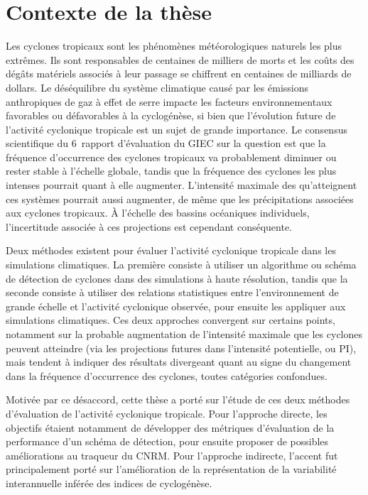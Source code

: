\documentclass[../main.tex]{subfiles}
\begin{document}
\section*{Contexte de la thèse}

Les cyclones tropicaux sont les phénomènes météorologiques naturels les plus extrêmes. Ils sont responsables de centaines de milliers de morts et les coûts des
dégâts matériels associés à leur passage se chiffrent en centaines de milliards de dollars. Le déséquilibre du système climatique causé par les émissions
anthropiques de gaz à effet de serre impacte les facteurs environnementaux favorables ou défavorables à la cyclogénèse, si bien que l'évolution future de
l'activité cyclonique tropicale est un sujet de grande importance. Le consensus scientifique du 6\ieme\ rapport d'évaluation du GIEC sur la question est que la
fréquence d'occurrence des cyclones tropicaux va probablement diminuer ou rester stable à l'échelle globale, tandis que la fréquence des cyclones les plus
intenses pourrait quant à elle augmenter. L'intensité maximale des qu'atteignent ces systèmes pourrait aussi augmenter, de même que les précipitations associées
aux cyclones tropicaux. À l'échelle des bassins océaniques individuels, l'incertitude associée à ces projections est cependant conséquente.

Deux méthodes existent pour évaluer l'activité cyclonique tropicale dans les simulations climatiques. La première consiste à utiliser un algorithme ou schéma de
détection de cyclones dans des simulations à haute résolution, tandis que la seconde consiste à utiliser des relations statistiques entre l'environnement de
grande échelle et l'activité cyclonique observée, pour ensuite les appliquer aux simulations climatiques. Ces deux approches convergent sur certains points,
notamment sur la probable augmentation de l'intensité maximale que les cyclones peuvent atteindre (via les projections futures dans l'intensité potentielle, ou
PI), mais tendent à indiquer des résultats divergeant quant au signe du changement dans la fréquence d'occurrence des cyclones, toutes catégories confondues.

Motivée par ce désaccord, cette thèse a porté sur l'étude de ces deux méthodes d'évaluation de l'activité cyclonique tropicale. Pour l'approche directe, les
objectifs étaient notamment de développer des métriques d'évaluation de la performance d'un schéma de détection, pour ensuite proposer de possibles
améliorations au traqueur du CNRM. Pour l'approche indirecte, l'accent fut principalement porté sur l'amélioration de la représentation de la variabilité
interannuelle inférée des indices de cyclogénèse.
\end{document}
